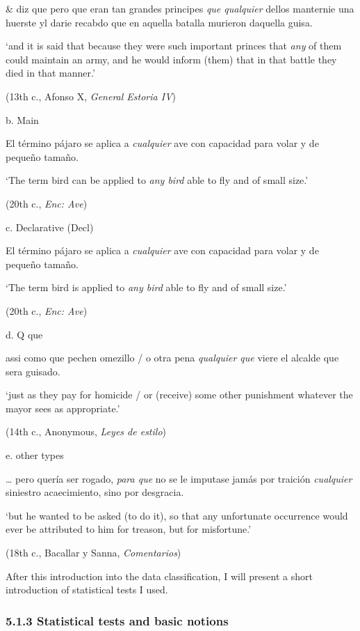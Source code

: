 \documentclass[output=paper]{langscibook}
\begin{document}
    \& diz que pero que eran tan grandes principes \textit{que qualquier} dellos manternie una huerste yl darie recabdo que en aquella batalla murieron daquella guisa. 

    ‘and it is said that because they were such important princes that \textit{any} of them could maintain an army, and he would inform (them) that in that battle they died in that manner.’

    (13th c., Afonso X, \textit{General Estoria IV})

  b.  Main

    El término pájaro se aplica a \textit{cualquier} ave con capacidad para volar y de pequeño tamaño. 

    ‘The term bird can be applied to \textit{any bird} able to fly and of small size.’

    (20th c., \textit{Enc: Ave})

  c.  Declarative (Decl)

    El término pájaro se aplica a \textit{cualquier} ave con capacidad para volar y de pequeño tamaño. 

    ‘The term bird is applied to \textit{any bird} able to fly and of small size.’

    (20th c., \textit{Enc: Ave})

  d.  Q que

    assi como que pechen omezillo / o otra pena \textit{qualquier que} viere el alcalde que sera guisado. 

    ‘just as they pay for homicide / or (receive) some other punishment whatever the mayor sees as appropriate.’

    (14th c., Anonymous, \textit{Leyes de estilo})

  e.  other types

    … pero quería ser rogado, \textit{para que} no se le imputase jamás por traición \textit{cualquier} siniestro acaecimiento, sino por desgracia. 

    ‘but he wanted to be asked (to do it), so that any unfortunate occurrence would ever be attributed to him for treason, but for misfortune.’

    (18th c., Bacallar y Sanna, \textit{Comentarios})

After this introduction into the data classification, I will present a short introduction of statistical tests I used.

\subsubsection{\textbf{5.1.3} \textbf{Statistical} \textbf{tests} \textbf{and} \textbf{basic} \textbf{notions}}
\end{document}
